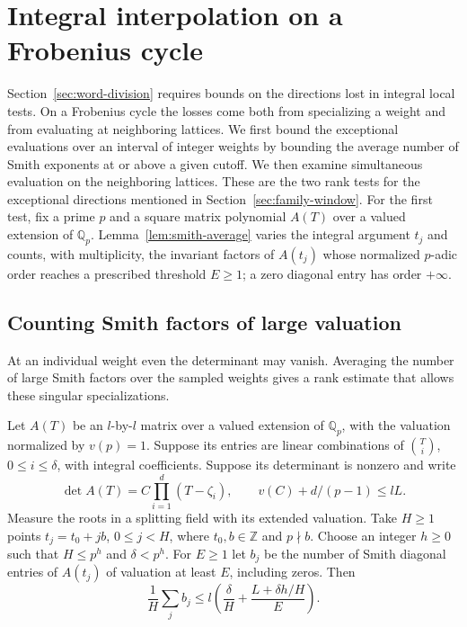 \section{Integral interpolation on a Frobenius cycle}
\label{sec:interpolation}
\hypertarget{source-interpolation}{}

Section~\ref{sec:word-division} requires bounds on the directions lost in integral local tests. On a Frobenius cycle the losses come both from specializing a weight and from evaluating at neighboring lattices. We first bound the exceptional
evaluations over an interval of integer weights by bounding the
average number of Smith exponents at or above a given cutoff. We then examine simultaneous
evaluation on the neighboring lattices. These are the two
rank tests for the exceptional directions mentioned in
Section~\ref{sec:family-window}. For the first test, fix a prime \(p\) and a square matrix polynomial \(A(T)\) over a valued extension of \(\mathbb Q_p\). Lemma~\ref{lem:smith-average} varies the integral
argument \(t_j\) and counts, with multiplicity, the invariant factors
of \(A(t_j)\) whose normalized \(p\)-adic order reaches a prescribed threshold \(E\ge1\); a zero
diagonal entry has order \(+\infty\).

\subsection{Counting Smith factors of large valuation}

At an individual weight even the determinant may vanish. Averaging the number of large Smith factors over the sampled weights gives a rank estimate that allows these singular specializations.

\begin{lemma}\label{lem:smith-average}
Let \(A(T)\) be an \(l\)-by-\(l\) matrix over a valued extension
of \(\mathbb Q_p\), with the valuation normalized by \(v(p)=1\).
Suppose its entries are linear combinations
of \(\binom{T}{i}\), \(0\le i\le\delta\), with integral
coefficients. Suppose its determinant is nonzero and write
\[
 \det A(T)=C\prod_{i=1}^d(T-\zeta_i),\qquad
 v(C)+d/(p-1)\le l L .
\]
Measure the roots in a splitting field with its extended valuation.
Take \(H\ge1\) points \(t_j=t_0+j b\), \(0\le j<H\), where
\(t_0,b\in\mathbb Z\) and \(p\nmid b\). Choose an integer
\(h\ge0\) such that \(H\le p^h\) and \(\delta<p^h\).
For \(E\ge1\) let \(b_j\) be the number of Smith diagonal
entries of \(A(t_j)\) of valuation at least \(E\), including
zeros. Then
\begin{equation}\label{eq:smith-average}
 \frac1H\sum_j b_j\le
 l\left(\frac{\delta}{H}+
        \frac{L+\delta h/H}{E}\right).
\end{equation}

\end{lemma}

